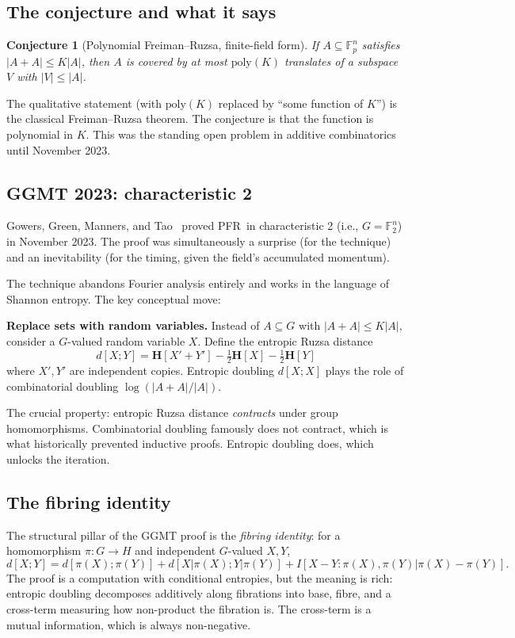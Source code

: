 \documentclass[11pt,a4paper]{article}
\theoremstyle{plain}
\newtheorem{conjecture}[theorem]{Conjecture}
\theoremstyle{definition}
\theoremstyle{remark}
\newcommand{\F}{\mathbb{F}}
\newcommand{\entropy}{\mathbf{H}}
\newcommand{\poly}{\mathrm{poly}}
\newcommand{\dist}{d}
\newcommand{\PFR}{\textsf{PFR}}
\begin{document}
\subsection{The conjecture and what it says}

\begin{conjecture}[Polynomial Freiman--Ruzsa, finite-field form]
If $A \subseteq \F_p^n$ satisfies $|A + A| \leq K|A|$, then $A$ is covered by at most $\poly(K)$ translates of a subspace $V$ with $|V| \leq |A|$.
\end{conjecture}

The qualitative statement (with $\poly(K)$ replaced by ``some function of $K$'') is the classical Freiman--Ruzsa theorem. The conjecture is that the function is polynomial in $K$. This was the standing open problem in additive combinatorics until November 2023.

\subsection{GGMT 2023: characteristic 2}

Gowers, Green, Manners, and Tao~\cite{ggmt2023} proved \PFR\ in characteristic 2 (i.e., $G = \F_2^n$) in November 2023. The proof was simultaneously a surprise (for the technique) and an inevitability (for the timing, given the field's accumulated momentum).

The technique abandons Fourier analysis entirely and works in the language of Shannon entropy. The key conceptual move:

\textbf{Replace sets with random variables.} Instead of $A \subseteq G$ with $|A + A| \leq K|A|$, consider a $G$-valued random variable $X$. Define the entropic Ruzsa distance
\[
\dist[X; Y] = \entropy[X' + Y'] - \tfrac{1}{2}\entropy[X] - \tfrac{1}{2}\entropy[Y]
\]
where $X', Y'$ are independent copies. Entropic doubling $\dist[X; X]$ plays the role of combinatorial doubling $\log(|A+A|/|A|)$.

The crucial property: entropic Ruzsa distance \emph{contracts} under group homomorphisms. Combinatorial doubling famously does not contract, which is what historically prevented inductive proofs. Entropic doubling does, which unlocks the iteration.

\subsection{The fibring identity}

The structural pillar of the GGMT proof is the \emph{fibring identity}: for a homomorphism $\pi: G \to H$ and independent $G$-valued $X, Y$,
\[
\dist[X; Y] = \dist[\pi(X); \pi(Y)] + \dist[X | \pi(X); Y | \pi(Y)] + I[X - Y : \pi(X), \pi(Y) | \pi(X) - \pi(Y)].
\]
The proof is a computation with conditional entropies, but the meaning is rich: entropic doubling decomposes additively along fibrations into base, fibre, and a cross-term measuring how non-product the fibration is. The cross-term is a mutual information, which is always non-negative.
\end{document}
